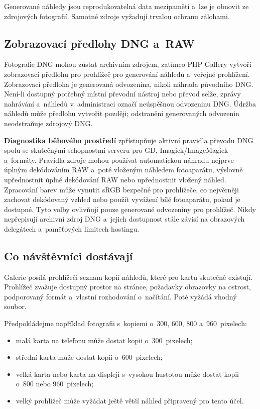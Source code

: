 \documentclass[11pt,a4paper]{article}
\newcommand{\ui}[1]{\textbf{#1}}
\begin{document}
Generované náhledy jsou reprodukovatelná data mezipaměti a~lze je obnovit ze
zdrojových fotografií. Samotné zdroje vyžadují trvalou ochranu zálohami.

\subsection{Zobrazovací předlohy DNG a~RAW}

Fotografie DNG mohou zůstat archivním zdrojem, zatímco PHP Gallery vytvoří
zobrazovací předlohu pro prohlížeč pro generování náhledů a~veřejné prohlížení.
Zobrazovací předloha je generovaná odvozenina, nikoli náhrada původního DNG.
Není-li dostupný potřebný místní převodní nástroj nebo převod selže, zprávy
nahrávání a~náhledů v~administraci označí neúspěšnou odvozeninu DNG. Údržba
náhledů může předlohu vytvořit později; odstranění generovaných odvozenin
neodstraňuje zdrojový DNG.

\ui{Diagnostika běhového prostředí} zpřístupňuje aktivní pravidla převodu DNG
spolu se skutečnými schopnostmi serveru pro GD, Imagick/ImageMagick a~formáty.
Pravidla zdroje mohou používat automatickou náhradu nejprve úplným dekódováním
RAW a~poté vloženým náhledem fotoaparátu, výslovně upřednostnit úplné dekódování
RAW nebo upřednostnit vložený náhled. Zpracování barev může vynutit sRGB
bezpečné pro prohlížeče, co nejvěrněji zachovat dekódovaný vzhled nebo použít
vyvážení bílé fotoaparátu, pokud je dostupné. Tyto volby ovlivňují pouze
generované odvozeniny pro prohlížeč. Nikdy nepřepisují archivní zdroj DNG
a~jejich dostupnost stále závisí na obrazových delegátech a~paměťových limitech
hostingu.

\subsection{Co návštěvníci dostávají}

Galerie posílá prohlížeči seznam kopií náhledů, které pro kartu skutečně
existují. Prohlížeč zvažuje dostupný prostor na stránce, požadavky obrazovky na
ostrost, podporovaný formát a~vlastní rozhodování o~načítání. Poté vyžádá vhodný
soubor.

Předpokládejme například fotografii s~kopiemi o~300, 600, 800 a~960~pixelech:

\begin{itemize}
  \item malá karta na telefonu může dostat kopii o~300~pixelech;
  \item střední karta může dostat kopii o~600~pixelech;
  \item velká karta nebo karta na displeji s~vysokou hustotou může dostat kopii
  o~800 nebo 960~pixelech;
  \item velký prohlížeč může vyžádat ještě větší náhled připravený pro tento
  účel.
\end{itemize}
\end{document}
